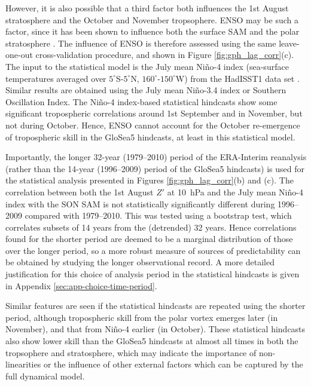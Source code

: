 However, it is also possible that a third factor both influences the 1st August
stratosphere and the October and November tropsophere. ENSO may be such a
factor, since it has been shown to influence both the surface SAM
\citep{Lim2013} and the polar stratosphere \citep{Hurwitz2011}. The influence of
ENSO is therefore assessed using the same leave-one-out cross-validation
procedure, and shown in Figure \ref{fig:gph_lag_corr}(c). The input to the
statistical model is the July mean Ni\~no-4 index (sea-surface temperatures
averaged over $5^{\circ}$S-$5^{\circ}$N, $160^{\circ}$-$150^{\circ}$W) from the
HadISST1 data set \citep{Rayner2003}. Similar results are obtained using the
July mean Ni\~no-3.4 index or Southern Oscillation Index. The Ni\~no-4
index-based statistical hindcasts show some significant tropospheric
correlations around 1st September and in November, but not during
October. Hence, ENSO cannot account for the October re-emergence of tropospheric
skill in the GloSea5 hindcasts, at least in this statistical model.

Importantly, the longer 32-year (1979--2010) period of the ERA-Interim
reanalysis (rather than the 14-year (1996--2009) period of the GloSea5
hindcasts) is used for the statistical analysis presented in Figures
\ref{fig:gph_lag_corr}(b) and (c). The correlation between both the 1st August
$Z'$ at 10~hPa and the July mean Ni\~no-4 index with the SON SAM is not
statistically significantly different during 1996--2009 compared with
1979--2010. This was tested using a bootstrap test, which correlates subsets of
14 years from the (detrended) 32 years. Hence correlations found for the shorter
period are deemed to be a marginal distribution of those over the longer period,
so a more robust measure of sources of predictability can be obtained by
studying the longer observational record. A more detailed justification for this
choice of analysis period in the statistical hindcasts is given in Appendix
\ref{sec:app-choice-time-period}.

Similar features are seen if the statistical hindcasts are repeated using the
shorter period, although tropospheric skill from the polar vortex emerges later
(in November), and that from Ni\~no-4 earlier (in October). These statistical
hindcasts also show lower skill than the GloSea5 hindcasts at almost all times
in both the tropsophere and stratosphere, which may indicate the importance of
non-linearities or the influence of other external factors which can be captured
by the full dynamical model.

